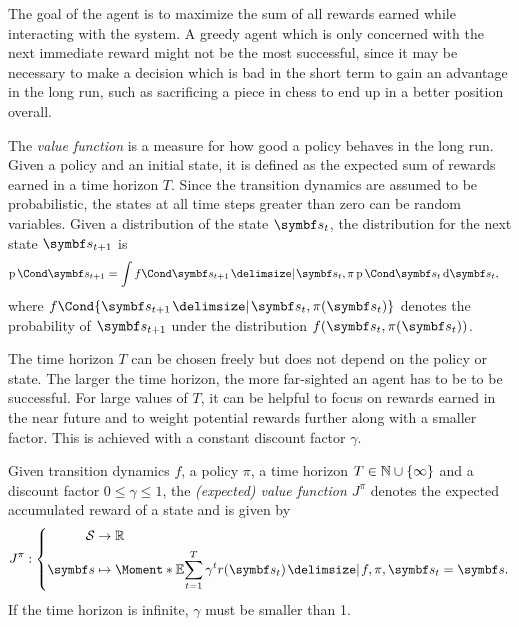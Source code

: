 The goal of the agent is to maximize the sum of all rewards earned while interacting with the system.
A greedy agent which is only concerned with the next immediate reward might not be the most successful, since it may be necessary to make a decision which is bad in the short term to gain an advantage in the long run, such as sacrificing a piece in chess to end up in a better position overall.

The \emph{value function} is a measure for how good a policy behaves in the long run.
Given a policy and an initial state, it is defined as the expected sum of rewards earned in a time horizon $T$.
Since the transition dynamics are assumed to be probabilistic, the states at all time steps greater than zero can be random variables.
Given a distribution of the state $\mat{s_t}$, the distribution for the next state $\mat{s_{t+1}}$ is
\begin{align}
    \Prob{\mat{s_{t+1}}} &= \int \Fun{f}{\mat{s_{t+1}} \given \mat{s_t}, \pi}\Prob{\mat{s_t}} \diff \mat{s_t},
\end{align}
where $f\Cond{\mat{s_{t+1}} \given \mat{s_t}, \pi(\mat{s_t})}$ denotes the probability of $\mat{s_{t+1}}$ under the distribution $f(\mat{s_t}, \pi(\mat{s_t}))$.

The time horizon $T$ can be chosen freely but does not depend on the policy or state.
The larger the time horizon, the more far-sighted an agent has to be to be successful.
For large values of $T$, it can be helpful to focus on rewards earned in the near future and to weight potential rewards further along with a smaller factor.
This is achieved with a constant discount factor $\gamma$.
\begin{definition}
    \label{def:reinforcement_learning:old_value_function}
    Given transition dynamics $f$, a policy $\pi$, a time horizon $T \in \mathbb{N} \cup \left\{ \infty \right\}$ and a discount factor $0 \leq \gamma \leq 1$, the \emph{(expected) value function $J^\pi$} denotes the expected accumulated reward of a state and is given by
    \begin{align}
        J^\pi : \left\{
            \begin{aligned}
                \Sc &\to \Rb \\
                \mat{s} &\mapsto \Moment*{\E}{\sum_{t=1}^T \gamma^t r(\mat{s}_t) \given f, \pi, \mat{s}_t = \mat{s}}.
            \end{aligned}
        \right.
    \end{align}
    If the time horizon is infinite, $\gamma$ must be smaller than 1.
\end{definition}

